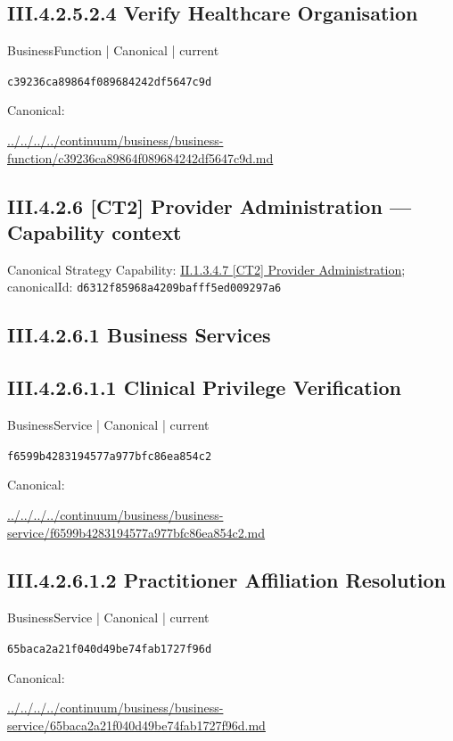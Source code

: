 \documentclass[10pt,a4paper]{article}
\begin{document}
\subsection*{III.4.2.5.2.4 Verify Healthcare Organisation}
\label{element-c39236ca89864f089684242df5647c9d}
{\small BusinessFunction | Canonical | current}\par
\texttt{c39236ca89864f089684242df5647c9d}\par
Canonical: \par
{\footnotesize\url{../../../../continuum/business/business-function/c39236ca89864f089684242df5647c9d.md}}\par
\subsection*{III.4.2.6 [CT2] Provider Administration — Capability context}
Canonical Strategy Capability: \hyperref[element-d6312f85968a4209bafff5ed009297a6]{II.1.3.4.7 [CT2] Provider Administration}; canonicalId: \texttt{d6312f85968a4209bafff5ed009297a6}\par
\subsection*{III.4.2.6.1 Business Services}
\subsection*{III.4.2.6.1.1 Clinical Privilege Verification}
\label{element-f6599b4283194577a977bfc86ea854c2}
{\small BusinessService | Canonical | current}\par
\texttt{f6599b4283194577a977bfc86ea854c2}\par
Canonical: \par
{\footnotesize\url{../../../../continuum/business/business-service/f6599b4283194577a977bfc86ea854c2.md}}\par
\subsection*{III.4.2.6.1.2 Practitioner Affiliation Resolution}
\label{element-65baca2a21f040d49be74fab1727f96d}
{\small BusinessService | Canonical | current}\par
\texttt{65baca2a21f040d49be74fab1727f96d}\par
Canonical: \par
{\footnotesize\url{../../../../continuum/business/business-service/65baca2a21f040d49be74fab1727f96d.md}}\par
\end{document}
